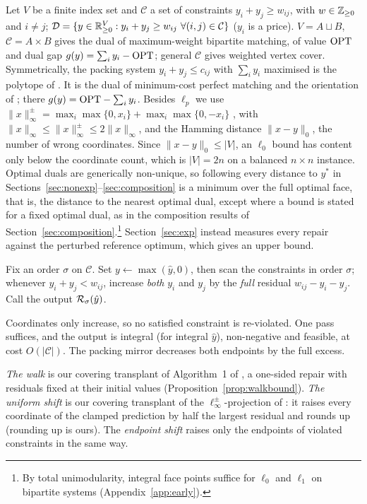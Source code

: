 Let $V$ be a finite index set and $\mathcal{C}$ a set of constraints $y_i + y_j \ge w_{ij}$, with
$w \in \mathbb{Z}_{\ge 0}$ and $i \ne j$; $\mathcal{D} = \{ y \in \mathbb{R}^V_{\ge 0} : y_i + y_j \ge w_{ij}\
\forall (i,j) \in \mathcal{C}\}$ ($y_i$ is a price). $V = A \sqcup B$, $\mathcal{C} = A \times B$
gives the dual of maximum-weight bipartite matching, of value $\mathrm{OPT}$ and dual gap
$g(y) = \sum_i y_i - \mathrm{OPT}$; general $\mathcal{C}$ gives weighted vertex cover. Symmetrically, the
packing system $y_i + y_j \le c_{ij}$ with $\sum_i y_i$ maximised is the polytope of
\citet{dinitz2021}. It is the dual of minimum-cost perfect matching and the orientation of
\citet[Thm.~3.2]{chen2022}; there $g(y) = \mathrm{OPT} - \sum_i y_i$.
Besides $\ell_p$ we use $\|x\|_\infty^\pm = \max_i \max\{0, x_i\} + \max_i \max\{0, -x_i\}$
\citep{sakaue2022}, with $\|x\|_\infty \le \|x\|_\infty^\pm \le 2\|x\|_\infty$, and the Hamming
distance $\|x - y\|_0$, the number of wrong coordinates. Since $\|x - y\|_0 \le |V|$, an $\ell_0$
bound has content only below the coordinate count, which is $|V| = 2n$ on a balanced $n \times n$
instance. Optimal duals are generically non-unique, so following \citet{sakaue2023} every distance
to $y^*$ in Sections~\ref{sec:nonexp}--\ref{sec:composition} is a minimum over the full optimal
face, that is, the distance to the nearest optimal dual, except where a bound is stated for a fixed
optimal dual, as in the composition results of Section~\ref{sec:composition}.\footnote{By total unimodularity, integral face
points suffice for $\ell_0$ and $\ell_1$ on bipartite systems (Appendix~\ref{app:early}).}
Section~\ref{sec:exp} instead measures every repair against the perturbed reference optimum, which
gives an upper bound.

\begin{definition}\label{def:greedy}
Fix an order $\sigma$ on $\mathcal{C}$. Set $y \leftarrow \max(\hat{y}, 0)$, then scan the
constraints in order $\sigma$; whenever $y_i + y_j < w_{ij}$, increase \emph{both} $y_i$ and $y_j$ by
the \emph{full} residual $w_{ij} - y_i - y_j$. Call the output $\mathcal{R}_\sigma(\hat{y})$.
\end{definition}

Coordinates only increase, so no satisfied constraint is re-violated. One pass suffices, and the
output is integral (for integral $\hat{y}$), non-negative and feasible, at cost $O(|\mathcal{C}|)$.
The packing mirror decreases both endpoints by the full excess.

\emph{The walk} is our covering transplant of Algorithm~1 of \citet{dinitz2021}, a one-sided repair
with residuals fixed at their initial values (Proposition~\ref{prop:walkbound}). \emph{The uniform
shift} is our covering transplant of the $\ell_\infty^\pm$-projection of
\citet{sakaue2022,sakaue2023}: it raises every coordinate of the clamped prediction by half the
largest residual and rounds up (rounding up is ours). The \emph{endpoint shift} raises only the
endpoints of violated constraints in the same way.

